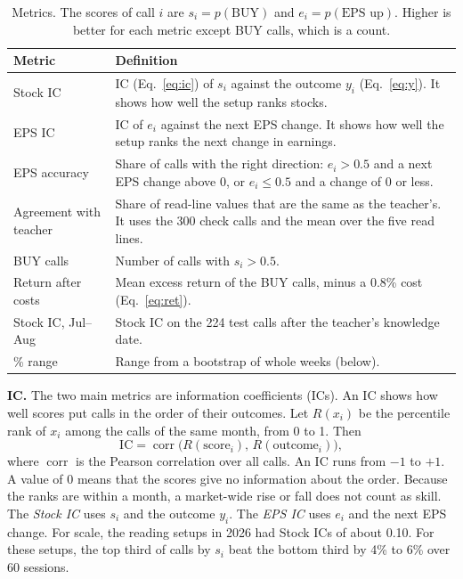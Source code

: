 \documentclass[sigconf,nonacm]{acmart}
\begin{document}
\begin{table}[t]
\caption{Metrics. The scores of call $i$ are $s_i = p(\text{BUY})$ and $e_i = p(\text{EPS up})$. Higher is better for each metric except BUY calls, which is a count.}
\label{tab:metrics}
\small
\begin{tabularx}{\columnwidth}{@{}>{\raggedright\arraybackslash}p{2.1cm}>{\raggedright\arraybackslash}X@{}}
\toprule
Metric & Definition \\
\midrule
Stock IC & IC (Eq.~\ref{eq:ic}) of $s_i$ against the outcome $y_i$ (Eq.~\ref{eq:y}). It shows how well the setup ranks stocks. \\
EPS IC & IC of $e_i$ against the next EPS change. It shows how well the setup ranks the next change in earnings. \\
EPS accuracy & Share of calls with the right direction: $e_i > 0.5$ and a next EPS change above 0, or $e_i \le 0.5$ and a change of 0 or less. \\
Agreement with teacher & Share of read-line values that are the same as the teacher's. It uses the 300 check calls and the mean over the five read lines. \\
BUY calls & Number of calls with $s_i > 0.5$. \\
Return after costs & Mean excess return of the BUY calls, minus a 0.8\% cost (Eq.~\ref{eq:ret}). \\
Stock IC, Jul--Aug & Stock IC on the 224 test calls after the teacher's knowledge date. \\
95\% range & Range from a bootstrap of whole weeks (below). \\
\bottomrule
\end{tabularx}
\end{table}

\textbf{IC.} The two main metrics are information coefficients (ICs).
An IC shows how well scores put calls in the order of their outcomes.
Let $R(x_i)$ be the percentile rank of $x_i$ among the calls of the same month, from 0 to 1.
Then
\begin{equation}\label{eq:ic}
\text{IC} = \operatorname{corr}\big(R(\text{score}_i),\, R(\text{outcome}_i)\big),
\end{equation}
where $\operatorname{corr}$ is the Pearson correlation over all calls.
An IC runs from $-1$ to $+1$.
A value of 0 means that the scores give no information about the order.
Because the ranks are within a month, a market-wide rise or fall does not count as skill.
The \emph{Stock IC} uses $s_i$ and the outcome $y_i$.
The \emph{EPS IC} uses $e_i$ and the next EPS change.
For scale, the reading setups in 2026 had Stock ICs of about 0.10.
For these setups, the top third of calls by $s_i$ beat the bottom third by 4\% to 6\% over 60 sessions.
\end{document}
